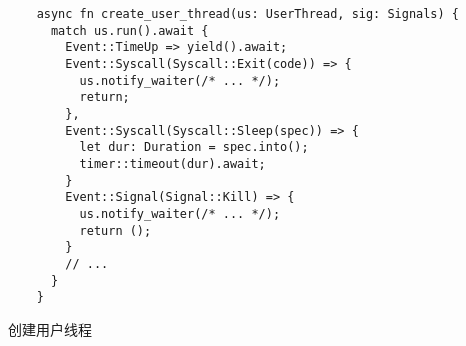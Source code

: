\documentclass[UTF-8]{ctexart}
\begin{document}
  \begin{listing}
  \begin{verbatim}
    async fn create_user_thread(us: UserThread, sig: Signals) {
      match us.run().await {
        Event::TimeUp => yield().await;
        Event::Syscall(Syscall::Exit(code)) => {
          us.notify_waiter(/* ... */);
          return;
        },
        Event::Syscall(Syscall::Sleep(spec)) => {
          let dur: Duration = spec.into();
          timer::timeout(dur).await;
        }
        Event::Signal(Signal::Kill) => {
          us.notify_waiter(/* ... */);
          return ();
        }
        // ...
      }
    }
  \end{verbatim}
  \caption{创建用户线程}
  \label{src:create_user_thread}
  \end{listing}
\end{document}
